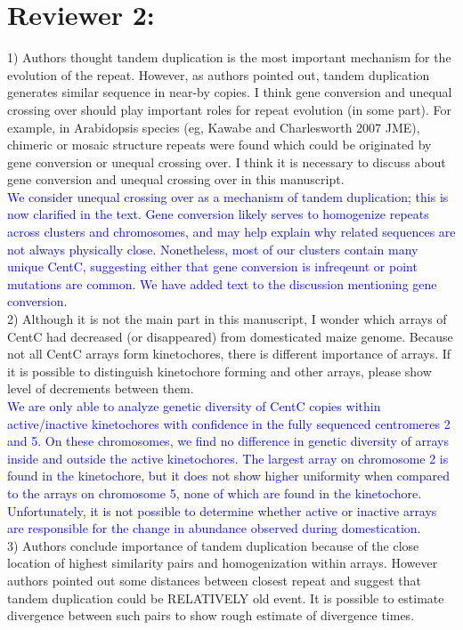 \documentclass[]{article}
\newcommand{\res}[1]{\noindent \textcolor{blue}{{#1}} \\}
\begin{document}
\section*{Reviewer 2:}

1) Authors thought tandem duplication is the most important mechanism for the evolution of the repeat. However, as authors pointed out, tandem duplication generates similar sequence in near-by copies. I think gene conversion and unequal crossing over should play important roles for repeat evolution (in some part). For example, in Arabidopsis species (eg, Kawabe and Charlesworth 2007 JME), chimeric or mosaic structure repeats were found which could be originated by gene conversion or unequal crossing over. I think it is necessary to discuss about gene conversion and unequal crossing over in this manuscript.\\

\res{We consider unequal crossing over as a mechanism of tandem duplication; this is now clarified in the text.
Gene conversion likely serves to homogenize repeats across clusters and chromosomes, and may help explain why related sequences are not always physically close.
Nonetheless, most of our clusters contain many unique CentC, suggesting either that gene conversion is infreqeunt or point mutations are common. 
We have added text to the discussion mentioning gene conversion.} 


2) Although it is not the main part in this manuscript, I wonder which arrays of CentC had decreased (or disappeared) from domesticated maize genome. Because not all CentC arrays form kinetochores, there is different importance of arrays. If it is possible to distinguish kinetochore forming and other arrays, please show level of decrements between them.\\

\res{We are only able to analyze genetic diversity of CentC copies within active/inactive kinetochores with confidence in the fully sequenced centromeres 2 and 5.  
On these chromosomes, we find no difference in genetic diversity of arrays inside and outside the active kinetochores.  
The largest array on chromosome 2 is found in the kinetochore, but it does not show higher uniformity when compared to the arrays on chromosome 5, none of which are found in the kinetochore.  
Unfortunately, it is not possible to determine whether active or inactive arrays are responsible for the change in abundance observed during domestication.}

3) Authors conclude importance of tandem duplication because of the close location of highest similarity pairs and homogenization within arrays. However authors pointed out some distances between closest repeat and suggest that tandem duplication could be RELATIVELY old event. It is possible to estimate divergence between such pairs to show rough estimate of divergence times.\\
\end{document}
